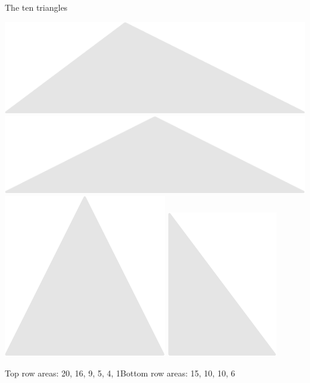 \documentclass[14pt]{beamer}
\begin{document}
\begin{frame}{The ten triangles}
\begin{center}
            \includegraphics[scale=0.3]{figures/figure024g.pdf}\quad
            \includegraphics[scale=0.3]{figures/figure024h.pdf}\quad
            \includegraphics[scale=0.3]{figures/figure024i.pdf}\quad
            \includegraphics[scale=0.3]{figures/figure024j.pdf}\\

            \bigskip

            {\footnotesize Top row areas: 20, 16, 9, 5, 4, 1\qquad Bottom row areas: 15, 10, 10, 6}
        \end{center}
    \end{frame}
\end{document}
